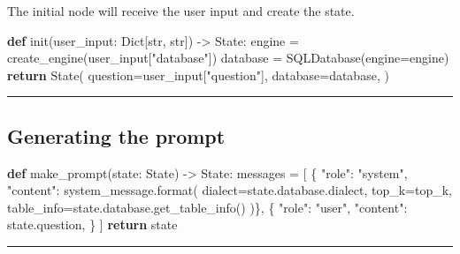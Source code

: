 \documentclass[
  letterpaper,
  DIV=11,
  numbers=noendperiod]{scrartcl}
\newenvironment{Shaded}{\begin{snugshade}}{\end{snugshade}}
\newcommand{\BuiltInTok}[1]{\textcolor[rgb]{0.00,0.23,0.31}{#1}}
\newcommand{\ControlFlowTok}[1]{\textcolor[rgb]{0.00,0.23,0.31}{\textbf{#1}}}
\newcommand{\KeywordTok}[1]{\textcolor[rgb]{0.00,0.23,0.31}{\textbf{#1}}}
\newcommand{\NormalTok}[1]{\textcolor[rgb]{0.00,0.23,0.31}{#1}}
\newcommand{\OperatorTok}[1]{\textcolor[rgb]{0.37,0.37,0.37}{#1}}
\newcommand{\StringTok}[1]{\textcolor[rgb]{0.13,0.47,0.30}{#1}}
\begin{document}
The initial node will receive the user input and create the state.

\begin{Shaded}
\begin{Highlighting}[]
\KeywordTok{def}\NormalTok{ init(user\_input: Dict[}\BuiltInTok{str}\NormalTok{, }\BuiltInTok{str}\NormalTok{]) }\OperatorTok{{-}\textgreater{}}\NormalTok{ State:}
\NormalTok{  engine }\OperatorTok{=}\NormalTok{ create\_engine(user\_input[}\StringTok{"database"}\NormalTok{])}
\NormalTok{  database }\OperatorTok{=}\NormalTok{ SQLDatabase(engine}\OperatorTok{=}\NormalTok{engine)}
  \ControlFlowTok{return}\NormalTok{ State(}
\NormalTok{    question}\OperatorTok{=}\NormalTok{user\_input[}\StringTok{"question"}\NormalTok{], }
\NormalTok{    database}\OperatorTok{=}\NormalTok{database,}
\NormalTok{  )}
\end{Highlighting}
\end{Shaded}

\begin{center}\rule{0.5\linewidth}{0.5pt}\end{center}

\subsection{Generating the prompt}\label{generating-the-prompt}

\begin{Shaded}
\begin{Highlighting}[]
\KeywordTok{def}\NormalTok{ make\_prompt(state: State) }\OperatorTok{{-}\textgreater{}}\NormalTok{ State:}
\NormalTok{    messages }\OperatorTok{=}\NormalTok{ [}
\NormalTok{      \{}
        \StringTok{"role"}\NormalTok{: }\StringTok{"system"}\NormalTok{, }
        \StringTok{"content"}\NormalTok{: system\_message.}\BuiltInTok{format}\NormalTok{(}
\NormalTok{          dialect}\OperatorTok{=}\NormalTok{state.database.dialect, }
\NormalTok{          top\_k}\OperatorTok{=}\NormalTok{top\_k,}
\NormalTok{          table\_info}\OperatorTok{=}\NormalTok{state.database.get\_table\_info()}
\NormalTok{        )\},}
\NormalTok{      \{}
        \StringTok{"role"}\NormalTok{: }\StringTok{"user"}\NormalTok{, }
        \StringTok{"content"}\NormalTok{: state.question,}
\NormalTok{      \}}
\NormalTok{    ]}
    \ControlFlowTok{return}\NormalTok{ state}
\end{Highlighting}
\end{Shaded}

\begin{center}\rule{0.5\linewidth}{0.5pt}\end{center}
\end{document}
